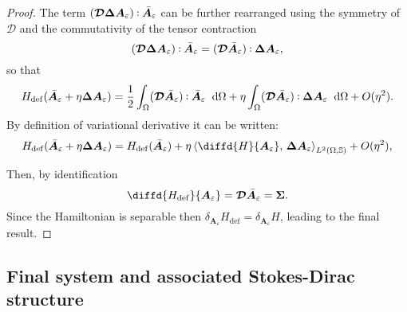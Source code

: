 \begin{proposition}
\begin{proof}
		The term $(\bm{\mathcal{D}} \bm{\Delta}\bm{A}_{\varepsilon}) \cddot \bar{\bm{A}}_{\varepsilon}$ can be further rearranged using the symmetry of $\bm{\mathcal{D}}$ and the commutativity of the tensor contraction
		\begin{equation*} 
		(\bm{\mathcal{D}} \bm{\Delta}\bm{A}_{\varepsilon}) \cddot \bar{\bm{A}}_{\varepsilon} = (\bm{\mathcal{D}} \bar{\bm{A}}_{\varepsilon}) \cddot \bm{\Delta}\bm{A}_{\varepsilon},
		\end{equation*}
		so that 
		\begin{equation*}
		H_{\mathrm{def}}(\bar{\bm{A}}_{\varepsilon} + \eta \bm{\Delta}\bm{A}_{\varepsilon}) = \frac{1}{2} \int_{\Omega} (\bm{\mathcal{D}} \bar{\bm{A}}_{\varepsilon}) \cddot \bar{\bm{A}}_{\varepsilon} \; \d\Omega + \eta \int_{\Omega} (\bm{\mathcal{D}} \bar{\bm{A}}_{\varepsilon}) \cddot \bm{\Delta}\bm{A}_{\varepsilon}\; \d\Omega  + O(\eta^2). 
		\end{equation*}
		By definition of  variational derivative it can be written:
		\begin{equation*}H_{\mathrm{def}}(\bar{\bm{A}}_{\varepsilon} + \eta \bm{\Delta}\bm{A}_{\varepsilon}) = H_{\mathrm{def}}(\bar{\bm{A}}_{\varepsilon}) + \eta \inner[L^2(\Omega, \mathbb{S})]{\diffd{H}{\bm{A}_{\varepsilon}}}{\bm{\Delta}\bm{A}_{\varepsilon}} + O(\eta^2), \end{equation*}
		
		Then, by identification 
		\begin{equation*}
		\diffd{H_{\mathrm{def}}}{\bm{A}_{\varepsilon}} = \bm{\mathcal{D}} \bar{\bm{A}}_{\varepsilon} = \bm{\Sigma}.
		\end{equation*}
		Since the Hamiltonian is separable then $\delta_{\bm{A}_{\varepsilon}}{H_{\mathrm{def}}} =\delta_{\bm{A}_{\varepsilon}} H$, leading to the final result.
	\end{proof}
\end{proposition}

\subsection{Final system and associated Stokes-Dirac structure}

